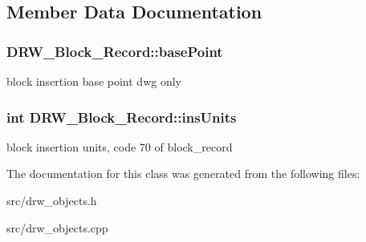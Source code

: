 \subsection{Member Data Documentation}
\hypertarget{class_d_r_w___block___record_a95b52334c0b306ac7c07f2d66f13d1cf}{}
\subsubsection[{base\+Point}]{ D\+R\+W\+\_\+\+Block\+\_\+\+Record\+::base\+Point}\label{class_d_r_w___block___record_a95b52334c0b306ac7c07f2d66f13d1cf}
block insertion base point dwg only \hypertarget{class_d_r_w___block___record_ad4a51c93d03294546b648f0b866577d7}{}
\subsubsection[{ins\+Units}]{\setlength{\rightskip}{0pt plus 5cm}int D\+R\+W\+\_\+\+Block\+\_\+\+Record\+::ins\+Units}\label{class_d_r_w___block___record_ad4a51c93d03294546b648f0b866577d7}
block insertion units, code 70 of block\+\_\+record 

The documentation for this class was generated from the following files\+:\begin{DoxyCompactItemize}
\item 
src/drw\+\_\+objects.\+h\item 
src/drw\+\_\+objects.\+cpp\end{DoxyCompactItemize}
